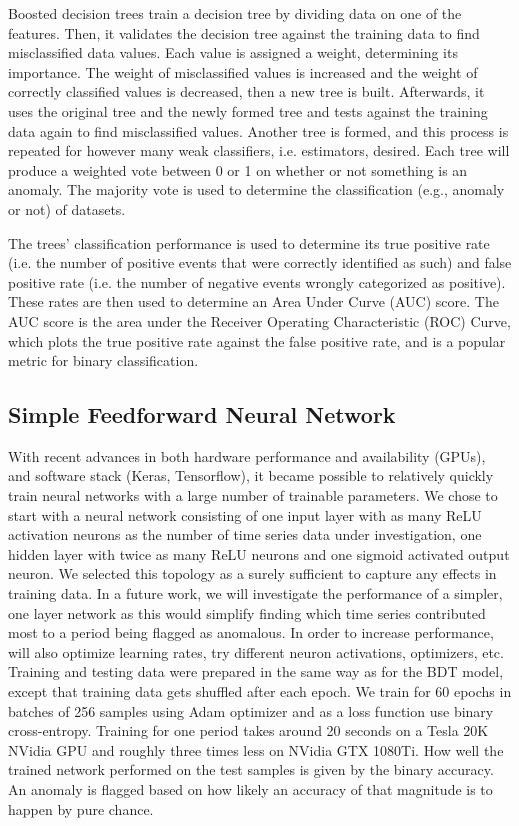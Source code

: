 \documentclass[5p]{elsarticle}
\begin{document}
Boosted decision trees train a decision tree by dividing data on one of the features. Then, it validates the decision tree against the training data to find misclassified data values. Each value is assigned a weight, determining its importance. The weight of misclassified values is increased and the weight of correctly classified values is decreased, then a new tree is built. Afterwards, it uses the original tree and the newly formed tree and tests against the training data again to find misclassified values. Another tree is formed, and this process is repeated for however many weak classifiers, i.e. estimators, desired. Each tree will produce a weighted vote between 0 or 1 on whether or not something is an anomaly. The majority vote is used to determine the classification (e.g., anomaly or not) of datasets.

The trees' classification performance is used to determine its true positive rate (i.e. the number of positive events that were correctly identified as such) and false positive rate (i.e. the number of negative events wrongly categorized as positive). These rates are then used to determine an Area Under Curve (AUC) score. The AUC score is the area under the Receiver Operating Characteristic (ROC) Curve, which plots the true positive rate against the false positive rate, and is a popular metric for binary classification.

\subsection{Simple Feedforward Neural Network}

With recent advances in both hardware performance and availability (GPUs), and software stack (Keras, Tensorflow), it became possible to relatively quickly train neural networks with a large number of trainable parameters. We chose to start with a neural network consisting of one input layer with as many ReLU activation neurons as the number of time series data under investigation, one hidden layer with twice as many ReLU neurons and one sigmoid activated output neuron. We selected this topology as a surely sufficient to capture any effects in training data. In a future work, we will investigate the performance of a simpler, one layer network as this would simplify finding which time series contributed most to a period being flagged as anomalous. In order to increase performance, will also optimize learning rates, try different neuron activations, optimizers,  etc.  
Training and testing data were prepared in the same way as for the BDT model, except that training data gets shuffled after each epoch. We train for 60 epochs in batches of 256 samples using Adam optimizer \cite{fifteen} and as a loss function use binary cross-entropy. Training for one period takes around 20 seconds on a Tesla 20K NVidia GPU and roughly three times less on NVidia GTX 1080Ti. How well the trained network performed on the test samples is given by the binary accuracy. An anomaly is flagged based on how likely an accuracy of that magnitude is to happen by pure chance.
\end{document}

